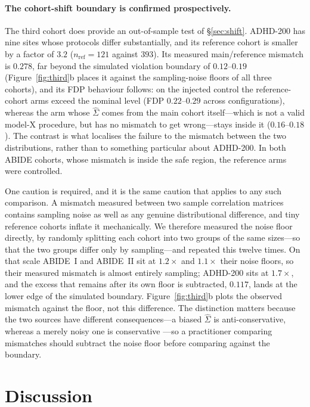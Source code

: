 \documentclass[11pt,a4paper]{article}
\begin{document}
\paragraph{The cohort-shift boundary is confirmed prospectively.}
The third cohort does provide an out-of-sample test of
\S\ref{sec:shift}. ADHD-200 has nine sites whose protocols differ
substantially, and its reference cohort is smaller by a factor of $3.2$
($n_{\mathrm{ref}}=121$ against $393$). Its measured main/reference mismatch
is $0.278$, far beyond the simulated violation boundary of
$0.12$--$0.19$ (Figure~\ref{fig:third}b places it against the sampling-noise
floors of all three cohorts), and its FDP behaviour follows: on the injected
control the
reference-cohort arms exceed the nominal level (FDP $0.22$--$0.29$ across
configurations), whereas the arm whose $\hat\Sigma$ comes from the main
cohort itself---which is not a valid model-X procedure, but has no mismatch
to get wrong---stays inside it ($0.16$--$0.18$). The contrast is what
localises the failure to the mismatch between the two distributions, rather
than to something particular about ADHD-200. In both ABIDE cohorts, whose
mismatch is inside the safe region, the reference arms were controlled.

One caution is required, and it is the same caution that applies to any
such comparison. A mismatch measured between two sample correlation
matrices contains sampling noise as well as any genuine distributional
difference, and tiny reference cohorts inflate it mechanically. We
therefore measured the noise floor directly, by randomly splitting each
cohort into two groups of the same sizes---so that the two groups differ
only by sampling---and repeated this twelve times. On that scale ABIDE~I and
ABIDE~II sit at $1.2\times$ and $1.1\times$ their noise floors, so their
measured mismatch is almost entirely sampling; ADHD-200 sits at $1.7\times$,
and the excess that remains after its own floor is subtracted, $0.117$, lands
at the lower edge of the simulated boundary.
Figure~\ref{fig:third}b plots the observed mismatch against the floor, not
this difference. The distinction matters because the two sources have different
consequences---a biased $\hat\Sigma$ is anti-conservative, whereas a merely
noisy one is conservative \citep{candes2018panning}---so a practitioner
comparing mismatches should subtract the noise floor before comparing
against the boundary.

\section{Discussion}
\label{sec:discussion}
\end{document}
